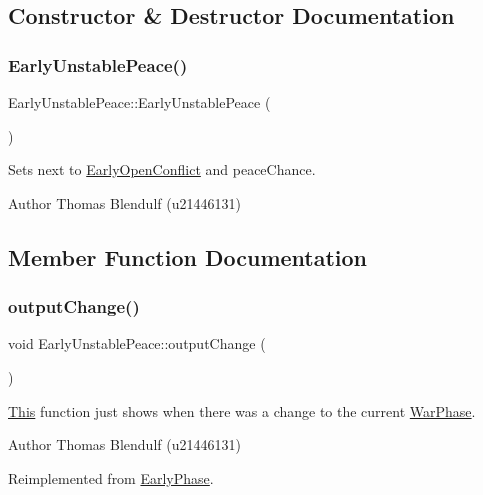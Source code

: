 \subsection{Constructor \& Destructor Documentation}
\mbox{\label{class_early_unstable_peace_a18e6e1d0cd2fbad582706ab00b888fbf}} 
\subsubsection{\texorpdfstring{EarlyUnstablePeace()}{EarlyUnstablePeace()}}
{\footnotesize\ttfamily Early\+Unstable\+Peace\+::\+Early\+Unstable\+Peace (\begin{DoxyParamCaption}{ }\end{DoxyParamCaption})}



Sets next to \mbox{\hyperlink{class_early_open_conflict}{Early\+Open\+Conflict}} and peace\+Chance. 

\begin{DoxyAuthor}{Author}
Thomas Blendulf (u21446131) 
\end{DoxyAuthor}


\subsection{Member Function Documentation}
\mbox{\label{class_early_unstable_peace_ab48c4136bd2efb74c74c537f697bfd0c}} 
\subsubsection{\texorpdfstring{outputChange()}{outputChange()}}
{\footnotesize\ttfamily void Early\+Unstable\+Peace\+::output\+Change (\begin{DoxyParamCaption}{ }\end{DoxyParamCaption})\hspace{0.3cm}{\ttfamily [virtual]}}



\mbox{\hyperlink{class_this}{This}} function just shows when there was a change to the current \mbox{\hyperlink{class_war_phase}{War\+Phase}}. 

\begin{DoxyAuthor}{Author}
Thomas Blendulf (u21446131) 
\end{DoxyAuthor}


Reimplemented from \mbox{\hyperlink{class_early_phase_a4dec6915b8c177199bc2b92a49fdb3af}{Early\+Phase}}.

